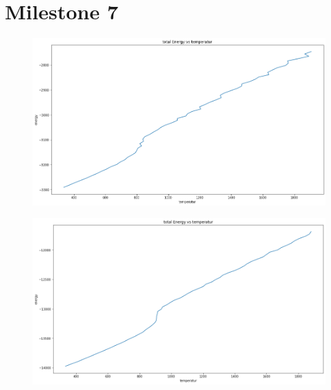 \chapter{Milestone 7}

\begin{figure}[!h]
	\begin{center}
		\includegraphics[scale=1]{Figure/m7temperaturEnergy923.png}
	\end{center}
	\label{PlotTempEnergy923}
\end{figure}

\begin{figure}[!h]
	\begin{center}
		\includegraphics[scale=1]{Figure/m7temperaturEnergy3781.png}
	\end{center}
	\label{PlotTempEnergy3781}
\end{figure}